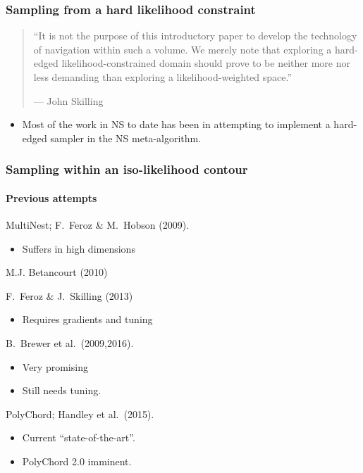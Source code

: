 \documentclass[%
]{beamer}
\begin{document}
\begin{frame}
  \frametitle{Sampling from a hard likelihood constraint} 

  \pause
  \begin{quote}
    ``It is not the purpose of this introductory paper to develop the technology of navigation within such a volume. We merely note that exploring a hard-edged likelihood-constrained domain should prove to be neither more nor less demanding than exploring a likelihood-weighted space.''
    
   {\hfill --- John Skilling}
  \end{quote}

  \begin{itemize}
      \pause
    \item Most of the work in NS to date has been in attempting to implement a hard-edged sampler in the NS meta-algorithm.
  \end{itemize}
 
\end{frame}


\begin{frame}
  \frametitle{Sampling within an iso-likelihood contour}
  \framesubtitle{Previous attempts}


  \begin{description}
    \pause\item[Rejection Sampling] MultiNest; F.\ Feroz \& M.\ Hobson (2009).
      \begin{itemize}
        \pause\item Suffers in high dimensions
      \end{itemize}
      \pause\item[Hamiltonian] M.J. Betancourt (2010) 
      \pause\item[Galilean] F.\ Feroz \& J.\ Skilling (2013) 
      \begin{itemize}
        \pause\item Requires gradients and tuning
      \end{itemize}
      \pause\item[Diffusive Nested Sampling] B.\ Brewer et al.\ (2009,2016).
      \begin{itemize}
        \pause\item Very promising
        \pause\item Still needs tuning.
      \end{itemize}
      \pause\item[Slice Sampling] PolyChord; Handley et al.\ (2015).
      \begin{itemize}
          \pause\item Current ``state-of-the-art''.
          \pause\item PolyChord 2.0 imminent.
      \end{itemize}
  \end{description}

\end{frame}
\end{document}
